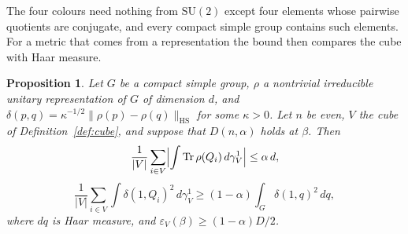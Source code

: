 \documentclass[aps,prd,twocolumn,superscriptaddress,nofootinbib,longbibliography,floatfix,amsmath,amssymb,10pt]{revtex4-2}
\newtheorem{proposition}[theorem]{Proposition}
\theoremstyle{definition}
\theoremstyle{remark}
\newcommand{\SU}{\mathrm{SU}}
\newcommand{\Tr}{\operatorname{Tr}}
\begin{document}
The four colours need nothing from $\SU(2)$ except four elements whose
pairwise quotients are conjugate, and every compact simple group contains
such elements. For a metric that comes from a representation the bound then
compares the cube with Haar measure.

\begin{proposition}\label{prop:fourcolours}
Let $G$ be a compact simple group, $\rho$ a nontrivial irreducible unitary
representation of $G$ of dimension $d$, and $\delta(p,q)=\kappa^{-1/2}\|\rho(p)
-\rho(q)\|_{\mathrm{HS}}$ for some $\kappa>0$. Let $n$ be even, $V$ the cube of
Definition~\ref{def:cube}, and suppose that $D(n,\alpha)$ holds at $\beta$.
Then
\[
\frac1{|V|}\sum_{i\in V}\Bigl|\int\Tr\rho(Q_i)\,d\gamma^1_V\Bigr|\le
\alpha\,d,
\]
\[
\frac1{|V|}\sum_{i\in V}\int\delta(1,Q_i)^2\,d\gamma^1_V\ge(1-\alpha)
\int_G\delta(1,q)^2\,dq ,
\]
where $dq$ is Haar measure, and $\varepsilon_V(\beta)\ge(1-\alpha)D/2$.
\end{proposition}
\end{document}
